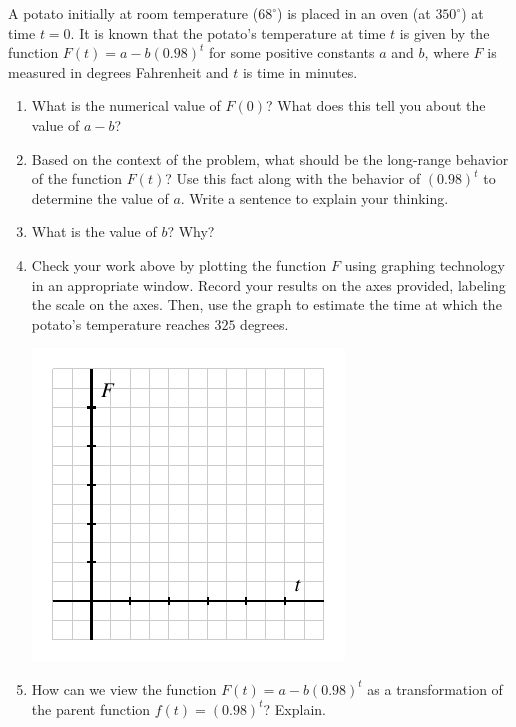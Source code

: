\documentclass[nooutcomes]{ximera}
\begin{document}
\begin{exploration}
A potato initially at room temperature (\(68^\circ\)) is placed in an oven (at \(350^\circ\)) at time \(t = 0\). It is known that the potato's temperature at time \(t\) is given by the function \(F(t) = a - b(0.98)^t\) for some positive constants \(a\) and \(b\), where \(F\) is measured in degrees Fahrenheit and \(t\) is time in minutes.

\begin{enumerate}[label=\alph*.]
\item What is the numerical value of \(F(0)\)? What does this tell you about the value of \(a - b\)?
\item Based on the context of the problem, what should be the long-range behavior of the function \(F(t)\)? Use this fact along with the behavior of \((0.98)^t\) to determine the value of \(a\).  Write a sentence to explain your thinking.
\item What is the value of \(b\)?  Why?%
\item Check your work above by plotting the function \(F\) using graphing technology in an appropriate window. Record your results on the axes provided, labeling the scale on the axes. Then, use the graph to estimate the time at which the potato's temperature reaches \(325\) degrees.
\begin{image}
\includegraphics{modeling-F-t-blank-axes}
\end{image}
\item How can we view the function \(F(t) = a - b(0.98)^t\) as a transformation of the parent function \(f(t) = (0.98)^t\)?  Explain.
\end{enumerate}
\end{exploration}
\end{document}
